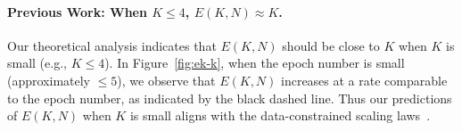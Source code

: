 






\paragraph{Previous Work: When $K\le 4$, $E(K,N) \approx K$.} Our theoretical analysis indicates that $E(K,N)$ should be close to $K$ when $K$ is small (e.g., $K\le 4$). 
In Figure~\ref{fig:ek-k}, when the epoch number is small (approximately $\le 5$), we observe that $E(K,N)$ increases at a rate comparable to the epoch number, 
as indicated by the black dashed line. 
Thus our predictions of $E(K,N)$ when $K$ is small aligns with the data-constrained scaling laws~\citep{muennighoff2023scaling}. 

